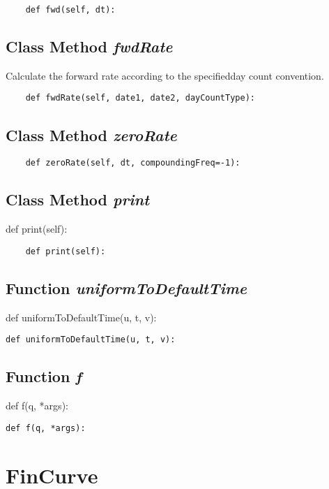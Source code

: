 \documentclass[twoside,11pt]{book}
\begin{document}
\begin{lstlisting}
    def fwd(self, dt):
\end{lstlisting}

\subsection{Class Method {\it fwdRate}}
Calculate the forward rate according to the specifiedday count convention. 

\begin{lstlisting}
    def fwdRate(self, date1, date2, dayCountType):
\end{lstlisting}

\subsection{Class Method {\it zeroRate}}


\begin{lstlisting}
    def zeroRate(self, dt, compoundingFreq=-1):
\end{lstlisting}

\subsection{Class Method {\it print}}
def print(self):

\begin{lstlisting}
    def print(self):
\end{lstlisting}

\subsection{Function {\it uniformToDefaultTime}}
def uniformToDefaultTime(u, t, v):

\begin{lstlisting}
def uniformToDefaultTime(u, t, v):
\end{lstlisting}

\subsection{Function {\it f}}
def f(q, *args):

\begin{lstlisting}
def f(q, *args):
\end{lstlisting}

\newpage
\section{FinCurve}
\end{document}

